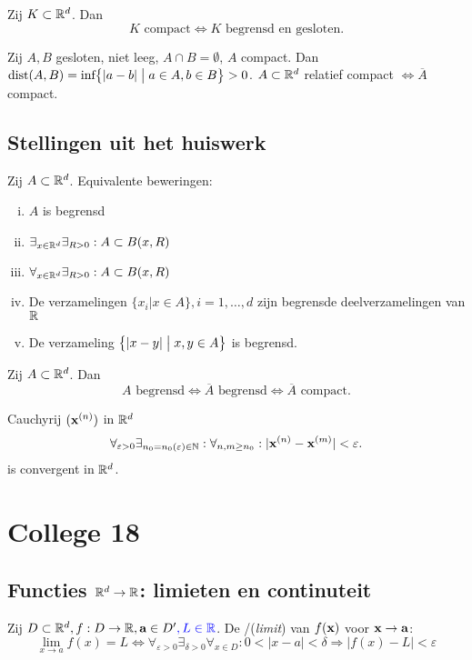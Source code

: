 \documentclass{2wa40summary}
\begin{document}
			Zij $K \subset \mathbb{R}^d$. Dan \[K \text{ compact}\Leftrightarrow K \text{ begrensd en gesloten.}\]
			
		\theorem Zij $A,B$ gesloten, niet leeg, $A\cap B = \emptyset$, $A$ compact.
			  Dan $\text{dist}(A,B) = \text{inf}\big\{ |a-b| \bigm| a \in A, b \in B \big\} > 0$.
			 $A \subset \mathbb{R}^d$  relatief compact $\iff \overline{A}$ compact.

	\subsection{Stellingen uit het huiswerk}
		\theorem Zij $A \subset \mathbb{R}^d$. Equivalente beweringen:
			\begin{enumerate}[(i)]
				\item $A$ is begrensd
				\item $\exists _{x \in \mathbb{R}^d} \exists _{R>0}: A \subset B(x,R)$
      			\item $\forall _{x \in \mathbb{R}^d} \exists _{R>0}: A \subset B(x,R)$
      			\item De verzamelingen $\{ x_i | x \in A \}, i=1,\dots,d$ zijn begrensde deelverzamelingen van $\mathbb{R}$
      			\item De verzameling $\big\{|x-y| \bigm| x,y \in A \big\}$ is begrensd.
			\end{enumerate}
		
		\theorem Zij $A \subset \mathbb{R}^d$. Dan \[A \text{ begrensd} \Leftrightarrow \overline{A} \text{ begrensd} \Leftrightarrow \overline{A}\text{ compact}.\]
		
		  Cauchyrij $({\textbf{x}}^{(n)})$ in $\mathbb{R}^d$ \[\forall _{\varepsilon >0} \exists _{n_0=n_0(\varepsilon )\in \mathbb{N}}:\forall _{n,m \geq n_0}: |{\textbf{x}}^{(n)}-{\textbf{x}}^{(m)}| < \varepsilon.\]
\theorem {} is convergent in $\mathbb{R}^d$.
	
\newpage
\section{College 18}
	\subsection{Functies $\mathbb{R}^d \rightarrow \mathbb{R}$: limieten en continu\blu{\"{\i}}teit}
		 Zij $D \subset \mathbb{R}^d, f: D\rightarrow \mathbb{R}, {\textbf{a}} \in D'{\color{blue}, L\in\mathbb{R}}$.
		  De /(\textit{limit}) van $f({\textbf{x}})$ voor ${\textbf{x}}\to{\textbf{a}}$:
		\[ \lim_{x\rightarrow a}f(x)=L \Leftrightarrow \forall _{\varepsilon >0} \exists _{\delta >0} \forall _{x \in D}: 0<|x-a|<\delta \Rightarrow |f(x)-L|<\varepsilon\]
		
\end{document}

